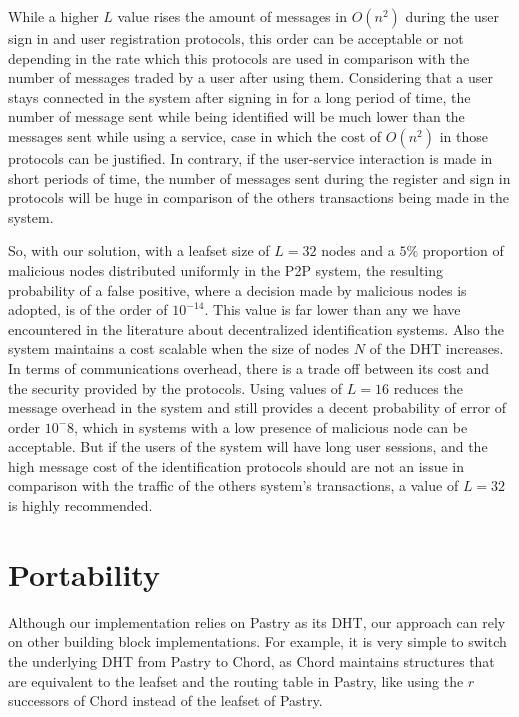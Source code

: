 While a higher $L$ value rises the amount of messages in $O(n^2)$ during the
user sign in and user registration protocols, this order can be acceptable
or not depending in the rate which this protocols are used in comparison with
the number of messages traded by a user after using them. Considering that a
user stays connected in the system after signing in  for a long period of time, the
number of message sent while being identified will be much lower than the messages
sent while using a service, case in which the cost of $O(n^2)$ in those
protocols can be justified. In contrary, if the user-service interaction
is made in short periods of time, the number of messages sent during the register and
sign in protocols will be huge in comparison of the others transactions being
made in the system. 

So, with our solution, with a leafset size of $L = 32$ nodes and a
$5\%$ proportion of malicious nodes distributed uniformly in the P2P system, the resulting probability of a false
positive, where a decision made by malicious nodes is adopted, is of the order
of $10^{-14}$. 
This value is far lower than any we have encountered in the
literature about decentralized identification systems. Also the system
maintains a cost scalable when the size of nodes $N$ of the DHT
increases. In terms of communications overhead, there is a trade off between its
cost and the security provided by the protocols. Using values of
$L = 16$ reduces the message overhead in the system and still provides a decent
probability of error of order $10^-8$, which in systems with a low presence of
malicious node can be acceptable. But if the users of the system
will have long user sessions, and the high message cost of the identification
protocols should are not an issue in comparison with the traffic of the others
system's transactions, a value of $L = 32$ is highly recommended. 


\section{Portability}

Although our implementation relies on Pastry as its DHT, our approach can rely
on other building block implementations. For example, it is very simple to
switch the underlying DHT from Pastry to Chord, as Chord maintains structures
that are equivalent to the leafset and the routing table in Pastry, like using
the $r$ successors of Chord instead of the leafset of Pastry.

